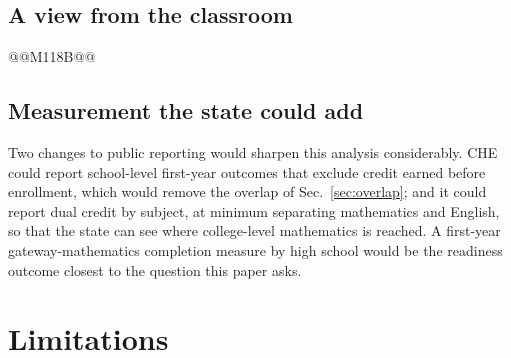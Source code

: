 \documentclass[aps,prd,reprint,superscriptaddress,nofootinbib,floatfix]{revtex4-2}
\begin{document}
\subsection{A view from the classroom}

@@M118B@@

\subsection{Measurement the state could add}

Two changes to public reporting would sharpen this analysis considerably. CHE could report school-level first-year outcomes that exclude credit earned before enrollment, which would remove the overlap of Sec.~\ref{sec:overlap}; and it could report dual credit by subject, at minimum separating mathematics and English, so that the state can see where college-level mathematics is reached. A first-year gateway-mathematics completion measure by high school would be the readiness outcome closest to the question this paper asks.

\section{Limitations}\label{sec:limitations}
\end{document}

